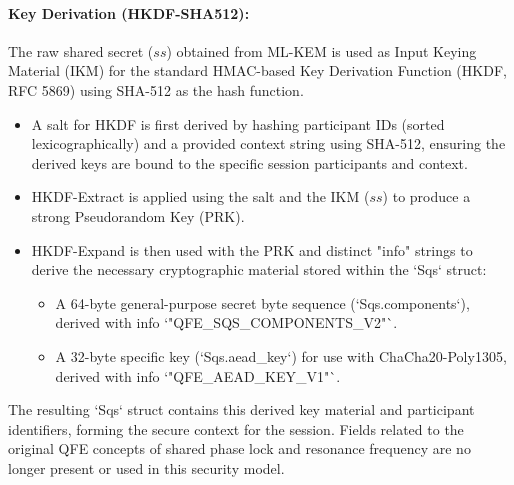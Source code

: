 \documentclass[11pt]{article}
\begin{document}
	\paragraph{Key Derivation (HKDF-SHA512):} The raw shared secret ($ss$) obtained from ML-KEM is used as Input Keying Material (IKM) for the standard HMAC-based Key Derivation Function (HKDF, RFC 5869) using SHA-512 as the hash function.
	\begin{itemize}
		\item A salt for HKDF is first derived by hashing participant IDs (sorted lexicographically) and a provided context string using SHA-512, ensuring the derived keys are bound to the specific session participants and context.
		\item HKDF-Extract is applied using the salt and the IKM ($ss$) to produce a strong Pseudorandom Key (PRK).
		\item HKDF-Expand is then used with the PRK and distinct "info" strings to derive the necessary cryptographic material stored within the `Sqs` struct:
		\begin{itemize}
			\item A 64-byte general-purpose secret byte sequence (`Sqs.components`), derived with info `"QFE\_SQS\_COMPONENTS\_V2"`.
			\item A 32-byte specific key (`Sqs.aead\_key`) for use with ChaCha20-Poly1305, derived with info `"QFE\_AEAD\_KEY\_V1"`.
		\end{itemize}
	\end{itemize}
	The resulting `Sqs` struct contains this derived key material and participant identifiers, forming the secure context for the session. Fields related to the original QFE concepts of shared phase lock and resonance frequency are no longer present or used in this security model.
	
\end{document}
